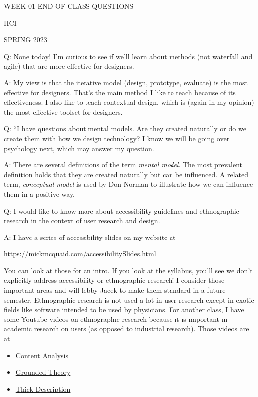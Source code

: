 
\begin{center}

  \textsf{\MakeUppercase{Week 01 End of Class Questions}}

\smallskip

\textsf{\MakeUppercase{HCI}}

\smallskip

\textsf{\MakeUppercase{Spring 2023}}

\end{center}


Q: None today! I'm curious to see if we'll learn about methods (not
waterfall and agile) that are more effective for designers.

A: My view is that the iterative model (design, prototype, evaluate) is
the most effective for designers. That's the main method I like to teach
because of its effectiveness. I also like to teach contextual design,
which is (again in my opinion) the most effective toolset for designers.

Q: ``I have questions about mental models. Are they created naturally or
do we create them with how we design technology? I know we will be going
over psychology next, which may answer my question.

A: There are several definitions of the term \emph{mental model}. The
most prevalent definition holds that they are created naturally but can
be influenced. A related term, \emph{conceptual model} is used by Don
Norman to illustrate how we can influence them in a positive way.

Q: I would like to know more about accessibility guidelines and
ethnographic research in the context of user research and design.

A: I have a series of accessibility slides on my website at

\url{https://mickmcquaid.com/accessibilitySlides.html}

You can look at those for an intro. If you look at the syllabus, you'll
see we don't explicitly address accessibility or ethnographic research!
I consider those important areas and will lobby Jacek to make them
standard in a future semester. Ethnographic research is not used a lot
in user research except in exotic fields like software intended to be
used by physicians. For another class, I have some Youtube videos on
ethnographic research because it is important in academic research on
users (as opposed to industrial research). Those videos are at

\begin{itemize}
\tightlist
\item
  \href{https://youtu.be/vntuKCTqRZg}{Content Analysis}
\item
  \href{https://youtu.be/D1BYdOKf_GA}{Grounded Theory}
\item
  \href{https://youtu.be/Owuwc1pCMNM}{Thick Description}
\end{itemize}

